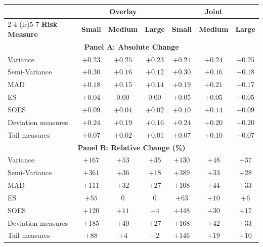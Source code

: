   \begin{tabular}{l*{6}{c}}
    \toprule
                          & \multicolumn{3}{c}{\textbf{Overlay}}             & \multicolumn{3}{c}{\textbf{Joint}} \\
    \cmidrule(lr){2-4} \cmidrule(lr){5-7}
    \textbf{Risk Measure} & \textbf{Small} & \textbf{Medium} & \textbf{Large} & \textbf{Small} & \textbf{Medium} & \textbf{Large} \\
    \midrule
    \multicolumn{7}{c}{\textbf{Panel A: Absolute Change}} \\
    \midrule
    Variance              & $+0.23$ & $+0.25$ & $+0.23$ & $+0.21$ & $+0.24$ & $+0.25$ \\
    Semi-Variance         & $+0.30$ & $+0.16$ & $+0.12$ & $+0.30$ & $+0.16$ & $+0.18$ \\
    MAD                   & $+0.18$ & $+0.15$ & $+0.14$ & $+0.19$ & $+0.21$ & $+0.17$ \\
    ES                    & $+0.04$ & $0.00$ & $0.00$ & $+0.05$ & $+0.05$ & $+0.05$ \\
    SOES                  & $+0.09$ & $+0.04$ & $+0.02$ & $+0.10$ & $+0.14$ & $+0.09$ \\
    \midrule
    Deviation measures    & $+0.24$ & $+0.19$ & $+0.16$ & $+0.24$ & $+0.20$ & $+0.20$ \\
    Tail measures         & $+0.07$ & $+0.02$ & $+0.01$ & $+0.07$ & $+0.10$ & $+0.07$ \\
    \midrule
    \multicolumn{7}{c}{\textbf{Panel B: Relative Change (\%)}} \\
    \midrule
    Variance              & $+167$ & $+53$ & $+35$ & $+130$ & $+48$ & $+37$ \\
    Semi-Variance         & $+361$ & $+36$ & $+18$ & $+389$ & $+33$ & $+28$ \\
    MAD                   & $+111$ & $+32$ & $+27$ & $+108$ & $+44$ & $+33$ \\
    ES                    & $+55$ & $0$ & $0$ & $+63$ & $+10$ & $+6$ \\
    SOES                  & $+120$ & $+11$ & $+4$ & $+448$ & $+30$ & $+17$ \\
    \midrule
    Deviation measures    & $+185$ & $+40$ & $+27$ & $+168$ & $+42$ & $+33$ \\
    Tail measures         & $+88$ & $+4$ & $+2$ & $+146$ & $+19$ & $+10$ \\
    \bottomrule
  \end{tabular}

